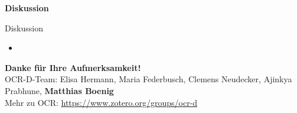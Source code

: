 \documentclass{bbawslides}
\begin{document}
\begin{bbawpart}{\Large\bf Diskussion}
\end{bbawpart}

\begin{bbawslide}{Diskussion}
  \vspace*{7mm}%
  \centerslidestrue%
  \begin{itemize}
    \item
  \end{itemize}
\end{bbawslide}

\begin{bbawpart}{\Large\bf Danke für Ihre Aufmerksamkeit!\\}
OCR-D-Team: Elisa Hermann, Maria Federbusch, Clemens Neudecker, Ajinkya Prabhune, \textbf{Matthias Boenig}\\
Mehr zu OCR: \url{https://www.zotero.org/groups/ocr-d}
\end{bbawpart}
\end{document}
